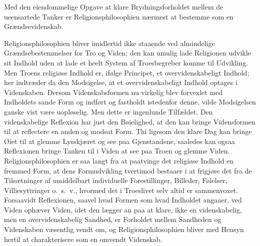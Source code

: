 \documentclass[12pt,a4paper]{article}
\begin{document}
Med den eiendommelige Opgave at klare Brydningsforholdet mellem
de ueensartede Tanker er Religionsphilosophien nærmest at
bestemme som en Grændsevidenskab.

Religionsphilosophien bliver imidlertid ikke staaende ved
almindelige Grændsebestemmelser for Tro og Viden; den kan
umulig lade Religionen udvikle sit Indhold uden at lade et heelt
System af Troesbegreber komme til Udvikling. Men Troens
religiøse Indhold er, ifølge Principet, et overvidenskabeligt
Indhold; her indtræder da den Modsigelse, at et
overvidenskabeligt Indhold optages i Videnskaben. Dersom
Videnskabsformen nu virkelig blev forvexlet med Indholdets sande
Form og indført og fastholdt istedenfor denne, vilde Modsigelsen
ganske vist være uopløselig. Men dette er ingenlunde Tilfældet.
Den videnskabelige Reflexion har just den Bøielighed, at den kan
bringe Vidensformen til at reflectere en anden og modsat Form.
Thi ligesom den klare Dag kan bringe Øiet til at glemme
Lysskjæret og see paa Gjenstandene, saaledes kan ogsaa
Reflexionen bringe Tanken til i Viden at see paa Troen og
glemme Viden. Religionsphilosophien er saa langt fra at
paatvinge det religiøse Indhold en fremmed Form, at dens
Formudvikling tvertimod bestaaer i at frigjøre det fra de
Tilsætninger af umiddelbart individuelle Forestillinger,
Billeder, Følelser, Villiesyttringer o.\ s.\ v., hvormed det i
Troeslivet selv altid er sammenvoxet. Forsaavidt Reflexionen,
saavel hvad Formen som hvad Indholdet angaaer, ved Viden
ophæver Viden, idet den lægger an paa at klare, ikke en
videnskabelig, men en overvidenskabelig Sandhed, er Forholdet
mellem Sandheden og Videnskaben væsentlig vendt om, og
Religionsphilosophien bliver med Hensyn hertil at charakterisere
som en omvendt Videnskab.
\end{document}
